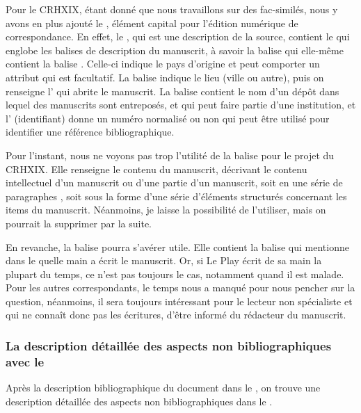 Pour le CRHXIX, étant donné que nous travaillons sur des fac-similés, nous y avons en plus ajouté le , élément capital pour l'édition numérique de correspondance. En effet, le , qui est une description de la source, contient le  qui englobe les balises de description du manuscrit, à savoir la balise  qui elle-même contient la balise . Celle-ci indique le pays d'origine et peut comporter un attribut  qui est facultatif. La balise  indique le lieu (ville ou autre), puis on renseigne l'  qui abrite le manuscrit. La balise  contient le nom d'un dépôt dans lequel des manuscrits sont entreposés, et qui peut faire partie d'une institution, et l' (identifiant) donne un numéro normalisé ou non qui peut être utilisé pour identifier une référence bibliographique.

Pour l'instant, nous ne voyons pas trop l'utilité de la balise  pour le projet du CRHXIX. Elle renseigne le contenu du manuscrit, décrivant le contenu intellectuel d'un manuscrit ou d'une partie d'un manuscrit, soit en une série de paragraphes , soit sous la forme d'une série d'éléments structurés  concernant les items du manuscrit. Néanmoins, je laisse la possibilité de l'utiliser, mais on pourrait la supprimer par la suite.

En revanche, la balise  pourra s'avérer utile. Elle contient la balise  qui mentionne dans le  quelle main a écrit le manuscrit. Or, si Le Play écrit de sa main la plupart du temps, ce n'est pas toujours le cas, notamment quand il est malade. Pour les autres correspondants, le temps nous a manqué pour nous pencher sur la question, néanmoins, il sera toujours intéressant pour le lecteur non spécialiste et qui ne connaît donc pas les écritures, d'être informé du rédacteur du manuscrit.

\subsubsection{La description détaillée des aspects non bibliographiques avec le }

Après la description bibliographique du document dans le , on trouve une description détaillée des aspects non bibliographiques dans le .


